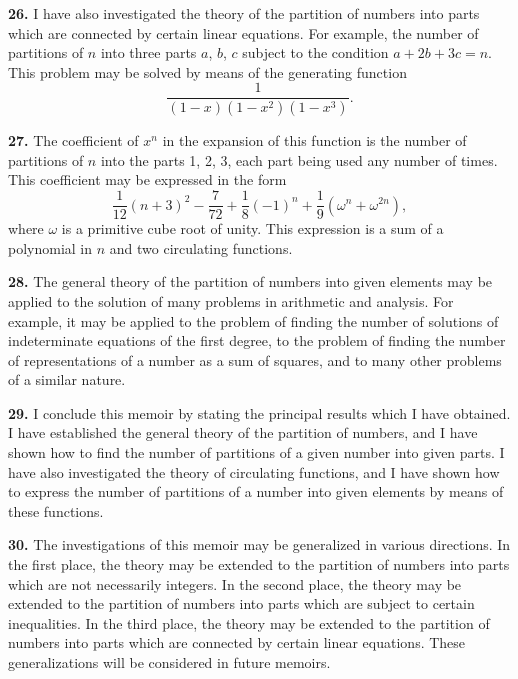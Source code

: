 \documentclass[11pt,a4paper]{book}
\begin{document}
\textbf{26.} I have also investigated the theory of the partition of numbers into parts which are connected by certain linear equations. For example, the number of partitions of $n$ into three parts $a$, $b$, $c$ subject to the condition $a + 2b + 3c = n$. This problem may be solved by means of the generating function
\[
\frac{1}{(1-x)(1-x^2)(1-x^3)}.
\]

\newpage
\setcounter{page}{244}

\textbf{27.} The coefficient of $x^n$ in the expansion of this function is the number of partitions of $n$ into the parts 1, 2, 3, each part being used any number of times. This coefficient may be expressed in the form
\[
\frac{1}{12}(n+3)^2 - \frac{7}{72} + \frac{1}{8}(-1)^n + \frac{1}{9}\left(\omega^n + \omega^{2n}\right),
\]
where $\omega$ is a primitive cube root of unity. This expression is a sum of a polynomial in $n$ and two circulating functions.

\textbf{28.} The general theory of the partition of numbers into given elements may be applied to the solution of many problems in arithmetic and analysis. For example, it may be applied to the problem of finding the number of solutions of indeterminate equations of the first degree, to the problem of finding the number of representations of a number as a sum of squares, and to many other problems of a similar nature.

\textbf{29.} I conclude this memoir by stating the principal results which I have obtained. I have established the general theory of the partition of numbers, and I have shown how to find the number of partitions of a given number into given parts. I have also investigated the theory of circulating functions, and I have shown how to express the number of partitions of a number into given elements by means of these functions.

\newpage
\setcounter{page}{245}

\textbf{30.} The investigations of this memoir may be generalized in various directions. In the first place, the theory may be extended to the partition of numbers into parts which are not necessarily integers. In the second place, the theory may be extended to the partition of numbers into parts which are subject to certain inequalities. In the third place, the theory may be extended to the partition of numbers into parts which are connected by certain linear equations. These generalizations will be considered in future memoirs.

\newpage
\setcounter{page}{246}
\end{document}
